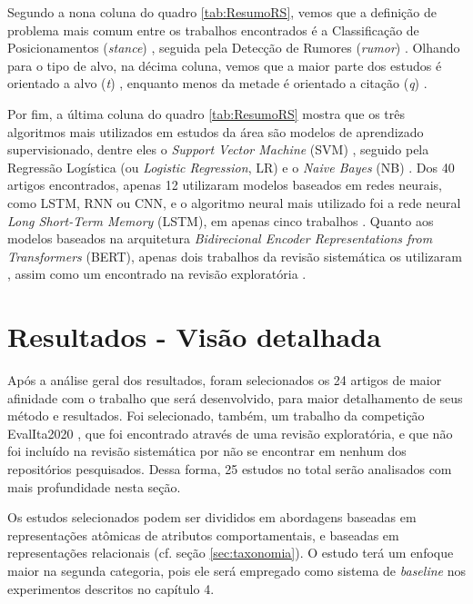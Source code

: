 \documentclass[
	12pt, oneside, a4paper, english, brazil
]{abntex2ppgsi}
\begin{document}
Segundo a nona coluna do quadro \ref{tab:ResumoRS}, vemos que a definição de problema mais comum entre os trabalhos encontrados é a Classificação de Posicionamentos ({\em stance}) \cite{walid2022, tanmoy2022}, seguida pela Detecção de Rumores ({\em rumor}) \cite{kiat2022, ayaz2021}. Olhando para o tipo de alvo, na décima coluna, vemos que a maior parte dos estudos é orientado a alvo ({\em t}) \cite{walid2022, stefan2022}, enquanto menos da metade é orientado a citação ({\em q}) \cite{kiat2022, sunderraman2022}.

Por fim, a última coluna do quadro \ref{tab:ResumoRS} mostra que os três algoritmos mais utilizados em estudos da área são modelos de aprendizado supervisionado, dentre eles o {\em Support Vector Machine} (SVM) \cite{walid2022, lucie2022}, seguido pela Regressão Logística (ou {\em Logistic Regression}, LR) \cite{lucie2022, ayaz2021} e o {\em Naive Bayes} (NB) \cite{ayaz2021, paolo_multi2020}. Dos 40 artigos encontrados, apenas 12 utilizaram modelos baseados em redes neurais, como LSTM, RNN ou CNN, e o algoritmo neural mais utilizado foi a rede neural {\em Long Short-Term Memory} (LSTM), em apenas cinco trabalhos \cite{daniel2017, isabelle2018, aono2020, hu2021, tanmoy2022}. Quanto aos modelos baseados na arquitetura {\em Bidirecional Encoder Representations from Transformers} (BERT), apenas dois trabalhos da revisão sistemática os utilizaram \cite{stefan2022, carolina2020}, assim como um encontrado na revisão exploratória \cite{espinosa2020deepreading}.

\section{Resultados - Visão detalhada}
\label{sec:visao-detalhada}

Após a análise geral dos resultados, foram selecionados os 24 artigos de maior afinidade com o trabalho que será desenvolvido, para maior detalhamento de seus método e resultados. Foi selecionado, também, um trabalho da competição EvalIta2020 \cite{espinosa2020deepreading}, que foi encontrado através de uma revisão exploratória, e que não foi incluído na revisão sistemática por não se encontrar em nenhum dos repositórios pesquisados. Dessa forma, 25 estudos no total serão analisados com mais profundidade nesta seção.

Os estudos selecionados podem ser divididos em abordagens baseadas em representações atômicas de atributos comportamentais, e baseadas em representações relacionais (cf. seção \ref{sec:taxonomia}). O estudo  terá um enfoque maior na segunda categoria, pois ele será empregado como sistema de {\em baseline} nos experimentos descritos no capítulo 4.
\end{document}
